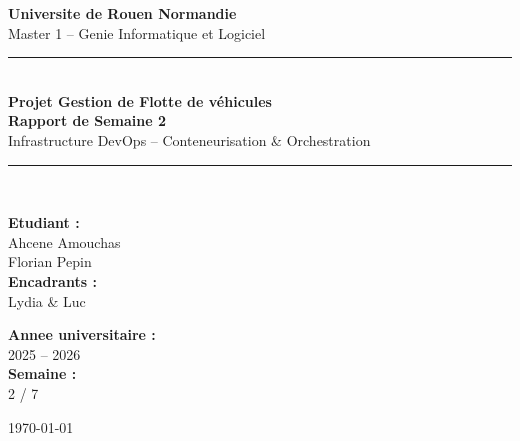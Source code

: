 \documentclass[12pt,a4paper]{article}
\begin{document}
\begin{titlepage}
  \centering
  \vspace*{1cm}

  {\Large\textbf{Universite de Rouen Normandie}\\[0.3cm]
  \large Master 1 -- Genie Informatique et Logiciel}

  \vspace{1.5cm}
  \rule{\linewidth}{0.5mm}\\[0.4cm]

  {\Huge\bfseries\color{primary} Projet Gestion de Flotte de véhicules\\[0.3cm]}
  {\LARGE\bfseries Rapport de Semaine 2}\\[0.3cm]
  {\large\color{darkgray} Infrastructure DevOps -- Conteneurisation \& Orchestration}

  \rule{\linewidth}{0.5mm}\\[1.5cm]

  \begin{minipage}{0.45\textwidth}
    \begin{flushleft}
      \textbf{Etudiant :}\\
      Ahcene Amouchas \\
      Florian Pepin \\[0.5cm]
      \textbf{Encadrants :}\\
      Lydia \& Luc
    \end{flushleft}
  \end{minipage}
  \hfill
  \begin{minipage}{0.45\textwidth}
    \begin{flushright}
      \textbf{Annee universitaire :}\\
      2025 -- 2026\\[0.5cm]
      \textbf{Semaine :}\\
      2 / 7
    \end{flushright}
  \end{minipage}

  \vfill
  {\large\today}
\end{titlepage}

\tableofcontents
\newpage

\end{document}
